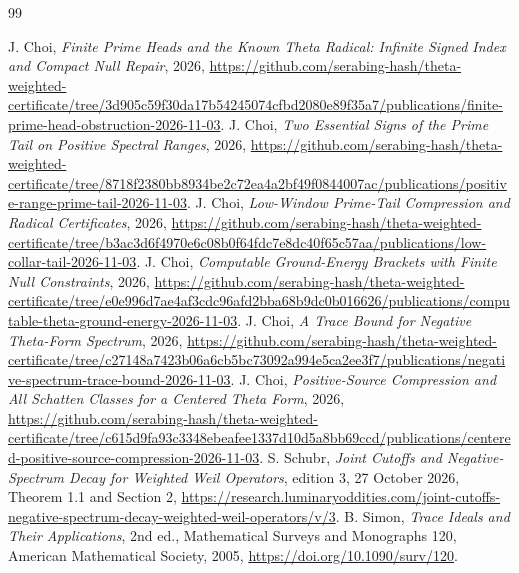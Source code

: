\documentclass[11pt,a4paper]{article}
\numberwithin{equation}{section}
\theoremstyle{definition}\newtheorem{definition}[theorem]{Definition}
\theoremstyle{remark}\newtheorem{remark}[theorem]{Remark}
\begin{document}
\begin{thebibliography}{99}\small

 J. Choi, \emph{Finite Prime Heads and the Known Theta Radical: Infinite Signed Index and Compact Null Repair}, 2026, \url{https://github.com/serabing-hash/theta-weighted-certificate/tree/3d905c59f30da17b54245074cfbd2080e89f35a7/publications/finite-prime-head-obstruction-2026-11-03}.
 J. Choi, \emph{Two Essential Signs of the Prime Tail on Positive Spectral Ranges}, 2026, \url{https://github.com/serabing-hash/theta-weighted-certificate/tree/8718f2380bb8934be2c72ea4a2bf49f0844007ac/publications/positive-range-prime-tail-2026-11-03}.
 J. Choi, \emph{Low-Window Prime-Tail Compression and Radical Certificates}, 2026, \url{https://github.com/serabing-hash/theta-weighted-certificate/tree/b3ac3d6f4970e6c08b0f64fdc7e8dc40f65c57aa/publications/low-collar-tail-2026-11-03}.
 J. Choi, \emph{Computable Ground-Energy Brackets with Finite Null Constraints}, 2026, \url{https://github.com/serabing-hash/theta-weighted-certificate/tree/e0e996d7ae4af3cdc96afd2bba68b9dc0b016626/publications/computable-theta-ground-energy-2026-11-03}.
 J. Choi, \emph{A Trace Bound for Negative Theta-Form Spectrum}, 2026, \url{https://github.com/serabing-hash/theta-weighted-certificate/tree/c27148a7423b06a6cb5bc73092a994e5ca2ee3f7/publications/negative-spectrum-trace-bound-2026-11-03}.
 J. Choi, \emph{Positive-Source Compression and All Schatten Classes for a Centered Theta Form}, 2026, \url{https://github.com/serabing-hash/theta-weighted-certificate/tree/c615d9fa93c3348ebeafee1337d10d5a8bb69ccd/publications/centered-positive-source-compression-2026-11-03}.
 S. Schubr, \emph{Joint Cutoffs and Negative-Spectrum Decay for Weighted Weil Operators}, edition 3, 27 October 2026, Theorem 1.1 and Section 2, \url{https://research.luminaryoddities.com/joint-cutoffs-negative-spectrum-decay-weighted-weil-operators/v/3}.
 B. Simon, \emph{Trace Ideals and Their Applications}, 2nd ed., Mathematical Surveys and Monographs 120, American Mathematical Society, 2005, \url{https://doi.org/10.1090/surv/120}.


\end{thebibliography}
\end{document}
